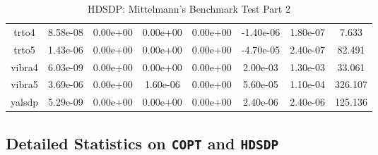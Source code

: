 {{\begin{table}[h]
\begin{center}
{\begin{tabular}{cccccccc}
      trto4 & 8.58e-08 & 0.00e+00 & 0.00e+00 & 0.00e+00 &
      -1.40e-06 & 1.80e-07 & 7.633\\
      trto5 & 1.43e-06 & 0.00e+00 & 0.00e+00 & 0.00e+00 &
      -4.70e-05 & 2.40e-07 & 82.491\\
      vibra4 & 6.03e-09 & 0.00e+00 & 0.00e+00 & 0.00e+00 &
      2.00e-03 & 1.30e-03 & 33.061\\
      vibra5 & 3.69e-06 & 0.00e+00 & 1.60e-06 & 0.00e+00 &
      5.60e-05 & 1.10e-04 & 326.107\\
      yalsdp & 5.29e-09 & 0.00e+00 & 0.00e+00 & 0.00e+00 &
      2.40e-06 & 2.40e-06 & 125.136\\
      \bottomrule
    \end{tabular}
  }  
\end{center}  
\caption{HDSDP: Mittelmann's Benchmark Test Part 2}
\end{table}}}

\subsection{Detailed Statistics on \texttt{COPT} and \texttt{HDSDP}}





